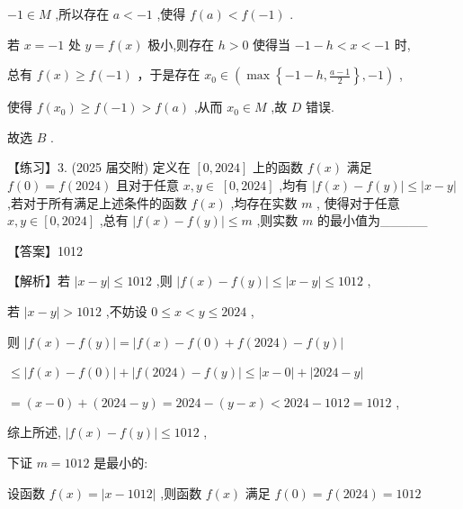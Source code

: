 \documentclass[10pt]{article}
\begin{document}
\(- 1 \in  M\) ,所以存在 \(a <  - 1\) ,使得 \(f\left( a\right)  < f\left( {-1}\right)\) .

若 \(x =  - 1\) 处 \(y = f\left( x\right)\) 极小,则存在 \(h > 0\) 使得当 \(- 1 - h < x <  - 1\) 时,

总有 \(f\left( x\right)  \geq  f\left( {-1}\right)\) ，于是存在 \({x}_{0} \in  \left( {\max \left\{  {-1 - h,\frac{a - 1}{2}}\right\}  , - 1}\right)\) ,

使得 \(f\left( {x}_{0}\right)  \geq  f\left( {-1}\right)  > f\left( a\right)\) ,从而 \({x}_{0} \in  M\) ,故 \(D\) 错误.

故选 \(B\) .

【练习】3. (2025 届交附) 定义在 \(\left\lbrack  {0,{2024}}\right\rbrack\) 上的函数 \(f\left( x\right)\) 满足 \(f\left( 0\right)  = f\left( {2024}\right)\) 且对于任意 \(x,y \in \; \left\lbrack  {0,{2024}}\right\rbrack\) ,均有 \(\left| {f\left( x\right)  - f\left( y\right) }\right|  \leq  \left| {x - y}\right|\) ,若对于所有满足上述条件的函数 \(f\left( x\right)\) ,均存在实数 \(m\) , 使得对于任意 \(x,y \in  \left\lbrack  {0,{2024}}\right\rbrack\) ,总有 \(\left| {f\left( x\right)  - f\left( y\right) }\right|  \leq  m\) ,则实数 \(m\) 的最小值为\_\_\_\_\_

【答案】1012

【解析】若 \(\left| {x - y}\right|  \leq  {1012}\) ,则 \(\left| {f\left( x\right)  - f\left( y\right) }\right|  \leq  \left| {x - y}\right|  \leq  {1012}\) ,

若 \(\left| {x - y}\right|  > {1012}\) ,不妨设 \(0 \leq  x < y \leq  {2024}\) ,

则 \(\left| {f\left( x\right)  - f\left( y\right) }\right|  = \left| {f\left( x\right)  - f\left( 0\right)  + f\left( {2024}\right)  - f\left( y\right) }\right|\)

\(\leq  \left| {f\left( x\right)  - f\left( 0\right) }\right|  + \left| {f\left( {2024}\right)  - f\left( y\right) }\right|  \leq  \left| {x - 0}\right|  + \left| {{2024} - y}\right|\)

\(= \left( {x - 0}\right)  + \left( {{2024} - y}\right)  = {2024} - \left( {y - x}\right)  < {2024} - {1012} = {1012}\) ,

综上所述, \(\left| {f\left( x\right)  - f\left( y\right) }\right|  \leq  {1012}\) ,

下证 \(m = {1012}\) 是最小的:

设函数 \(f\left( x\right)  = \left| {x - {1012}}\right|\) ,则函数 \(f\left( x\right)\) 满足 \(f\left( 0\right)  = f\left( {2024}\right)  = {1012}\)
\end{document}
